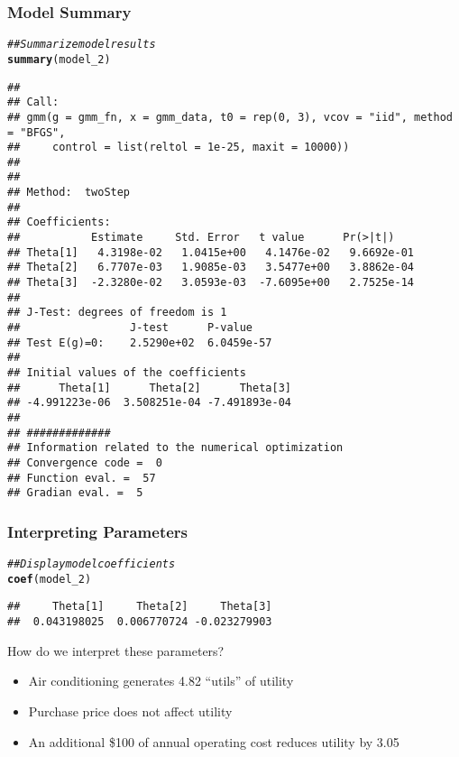 \documentclass{beamer}\usepackage[]{graphicx}\usepackage[]{color}
\makeatletter
\newcommand{\hlcom}[1]{\textcolor[rgb]{0.678,0.584,0.686}{\textit{#1}}}%
\newcommand{\hlstd}[1]{\textcolor[rgb]{0.345,0.345,0.345}{#1}}%
\newcommand{\hlkwd}[1]{\textcolor[rgb]{0.737,0.353,0.396}{\textbf{#1}}}%
\newenvironment{kframe}{%
 \def\at@end@of@kframe{}%
 \ifinner\ifhmode%
  \def\at@end@of@kframe{\end{minipage}}%
  \begin{minipage}{\columnwidth}%
 \fi\fi%
 \def\FrameCommand##1{\hskip\@totalleftmargin \hskip-\fboxsep
 \colorbox{shadecolor}{##1}\hskip-\fboxsep
     \hskip-\linewidth \hskip-\@totalleftmargin \hskip\columnwidth}%
 \MakeFramed {\advance\hsize-\width
   \@totalleftmargin\z@ \linewidth\hsize
   \@setminipage}}%
 {\par\unskip\endMakeFramed%
 \at@end@of@kframe}
\newenvironment{knitrout}{}{} %
\makeatother
\begin{document}
\begin{frame}[fragile]\frametitle{Model Summary}
\begin{knitrout}\tiny
{}\color{fgcolor}\begin{kframe}
\begin{alltt}
\hlcom{## Summarize model results}
\hlkwd{summary}\hlstd{(model_2)}
\end{alltt}
\begin{verbatim}
## 
## Call:
## gmm(g = gmm_fn, x = gmm_data, t0 = rep(0, 3), vcov = "iid", method = "BFGS", 
##     control = list(reltol = 1e-25, maxit = 10000))
## 
## 
## Method:  twoStep 
## 
## Coefficients:
##           Estimate     Std. Error   t value      Pr(>|t|)   
## Theta[1]   4.3198e-02   1.0415e+00   4.1476e-02   9.6692e-01
## Theta[2]   6.7707e-03   1.9085e-03   3.5477e+00   3.8862e-04
## Theta[3]  -2.3280e-02   3.0593e-03  -7.6095e+00   2.7525e-14
## 
## J-Test: degrees of freedom is 1 
##                 J-test      P-value   
## Test E(g)=0:    2.5290e+02  6.0459e-57
## 
## Initial values of the coefficients
##      Theta[1]      Theta[2]      Theta[3] 
## -4.991223e-06  3.508251e-04 -7.491893e-04 
## 
## #############
## Information related to the numerical optimization
## Convergence code =  0 
## Function eval. =  57 
## Gradian eval. =  5
\end{verbatim}
\end{kframe}
\end{knitrout}
\end{frame}

\begin{frame}[fragile]\frametitle{Interpreting Parameters}
\begin{knitrout}\footnotesize
{}\color{fgcolor}\begin{kframe}
\begin{alltt}
\hlcom{## Display model coefficients}
\hlkwd{coef}\hlstd{(model_2)}
\end{alltt}
\begin{verbatim}
##     Theta[1]     Theta[2]     Theta[3] 
##  0.043198025  0.006770724 -0.023279903
\end{verbatim}
\end{kframe}
\end{knitrout}
    \vspace{2ex}
    How do we interpret these parameters?
    \begin{itemize}
        \item Air conditioning generates 4.82 ``utils'' of utility
        \item Purchase price does not affect utility
        \item An additional \$100 of annual operating cost reduces utility by 3.05
    \end{itemize}
\end{frame}
\end{document}
